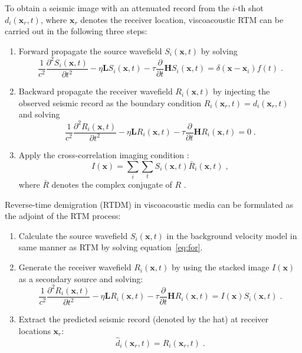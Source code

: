 To obtain a seismic image with an attenuated record from the $i$-th shot $d_i(\mathbf{x}_r,t)$, where $\mathbf{x}_r$ denotes the receiver location, viscoacoustic RTM can be carried out in the following three steps:
\begin{enumerate}[leftmargin=*]
  \item Forward propagate the source wavefield $S_i(\mathbf{x},t)$ by solving
  \begin{equation}
  \label{eq:for}
    \frac{1}{c^2}\frac{\partial^2 S_i(\mathbf{x},t)}{\partial t^2} - \eta \mathbf{L} S_i(\mathbf{x},t) - \tau \frac{\partial}{\partial t}\mathbf{H} S_i(\mathbf{x},t) = \delta(\mathbf{x}-\mathbf{x}_i) f(t) \; .
  \end{equation}
  \item Backward propagate the receiver wavefield $R_i(\mathbf{x},t)$ by injecting the observed seismic record as the boundary condition $R_i(\mathbf{x}_r,t) = d_i(\mathbf{x}_r,t)$ and solving
  \begin{equation}
  \label{eq:back}
    \frac{1}{c^2}\frac{\partial^2 R_i(\mathbf{x},t)}{\partial t^2} - \eta \mathbf{L} R_i(\mathbf{x},t) - \tau \frac{\partial}{\partial t} \mathbf{H} R_i(\mathbf{x},t) = 0 \;.
  \end{equation}
  \item Apply the cross-correlation imaging condition \cite[]{iei}:
  \begin{equation}
    \label{eq:ccr}
    I(\mathbf{x}) = \sum\limits_i \sum\limits_t S_i(\mathbf{x},t) \bar{R}_i(\mathbf{x},t) \;,
  \end{equation}
  where $\bar{R}$ denotes the complex conjugate of $R$ \cite[]{me13}.
\end{enumerate}

Reverse-time demigration (RTDM) in viscoacoustic media can be formulated as the adjoint of the RTM process:
\begin{enumerate}[leftmargin=*]
  \item Calculate the source wavefield $S_i(\mathbf{x},t)$ in the background velocity model in  same manner as RTM by solving equation~\ref{eq:for}.
  \item Generate the receiver wavefield $R_i(\mathbf{x},t)$ by using the stacked image $I(\mathbf{x})$ as a secondary source and solving:
  \begin{equation}
    \label{eq:back2}
    \frac{1}{c^2}\frac{\partial^2 R_i(\mathbf{x},t)}{\partial t^2} - \eta \mathbf{L} R_i(\mathbf{x},t) - \tau \frac{\partial}{\partial t} \mathbf{H} R_i(\mathbf{x},t) = I(\mathbf{x})S_i(\mathbf{x},t) \; .
  \end{equation}
  \item Extract the predicted seismic record (denoted by the hat) at receiver locations $\mathbf{x}_r$:
  \begin{equation}
    \widehat{d}_i(\mathbf{x}_r,t) = R_i(\mathbf{x}_r,t) \;.
  \end{equation}
\end{enumerate}

